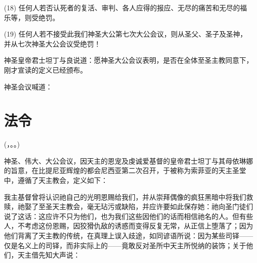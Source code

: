 (18) 任何人若否认死者的复活、审判、各人应得的报应、无尽的痛苦和无尽的福乐等，则受绝罚。\par

(19) 任何人若不接受此我们神圣大公第七次大公会议，则从圣父、圣子及圣神，并从七次神圣大公会议受绝罚！\par

\par

神圣皇帝君士坦丁与良说道：愿神圣大公会议表明，是否在全体至圣主教同意下，刚才宣读的定义已经颁布。\par

神圣会议喊道：\par


\section{法令}

(，。。)\par

神圣、伟大、大公会议，因天主的恩宠及虔诚爱基督的皇帝君士坦丁与其母依琳娜的旨意，在比提尼亚辉煌的都会尼西亚第二次召开，于被称为索菲亚的天主圣堂中，遵循了天主教会，定义如下：\par

我主基督曾将认识祂自己的光明恩赐给我们，并从崇拜偶像的疯狂黑暗中将我们救赎，祂娶了至圣天主教会，毫无玷污或缺陷，并应许要如此保存她：祂向圣门徒们说了这话：这应许不只为他们，也为我们这些因他们的话而相信祂名的人。但有些人，不考虑这份恩赐，因狡猾仇敌的诱惑而变得反复无常，从正信上堕落了；因为他们背离了天主教的传统，在真理上误入歧途，如同谚语所说：因为某些司铎——仅是名义上的司铎，而非实际上的——竟敢反对圣所中天主所悦纳的装饰；关于他们，天主借先知大声说：\par

